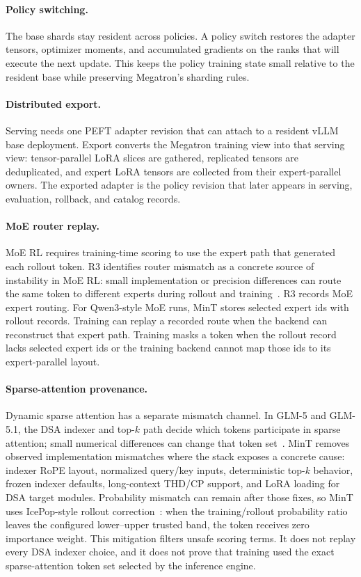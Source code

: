 \documentclass{llmxive}
\begin{document}
\paragraph{Policy switching.}
The base shards stay resident across policies. A policy switch restores the adapter tensors, optimizer moments, and accumulated gradients on the ranks that will execute the next update. This keeps the policy training state small relative to the resident base while preserving Megatron's sharding rules.

\paragraph{Distributed export.}
Serving needs one PEFT adapter revision that can attach to a resident vLLM base deployment. Export converts the Megatron training view into that serving view: tensor-parallel LoRA slices are gathered, replicated tensors are deduplicated, and expert LoRA tensors are collected from their expert-parallel owners. The exported adapter is the policy revision that later appears in serving, evaluation, rollback, and catalog records.

\paragraph{MoE router replay.}
MoE RL requires training-time scoring to use the expert path that generated each rollout token. R3 identifies router mismatch as a concrete source of instability in MoE RL: small implementation or precision differences can route the same token to different experts during rollout and training~\citep{r3_moe_router2025,chiang2026routerreplay}. R3 records MoE expert routing. For Qwen3-style MoE runs, MinT stores selected expert ids with rollout records. Training can replay a recorded route when the backend can reconstruct that expert path. Training masks a token when the rollout record lacks selected expert ids or the training backend cannot map those ids to its expert-parallel layout.

\paragraph{Sparse-attention provenance.}
Dynamic sparse attention has a separate mismatch channel. In GLM-5 and GLM-5.1, the DSA indexer and top-$k$ path decide which tokens participate in sparse attention; small numerical differences can change that token set~\citep{glm5_2026,stevenchiang2026supportglm5inmint}. MinT removes observed implementation mismatches where the stack exposes a concrete cause: indexer RoPE layout, normalized query/key inputs, deterministic top-$k$ behavior, frozen indexer defaults, long-context THD/CP support, and LoRA loading for DSA target modules. Probability mismatch can remain after those fixes, so MinT uses IcePop-style rollout correction~\citep{ling_every_step2025}: when the training/rollout probability ratio leaves the configured lower--upper trusted band, the token receives zero importance weight. This mitigation filters unsafe scoring terms. It does not replay every DSA indexer choice, and it does not prove that training used the exact sparse-attention token set selected by the inference engine.
\end{document}
